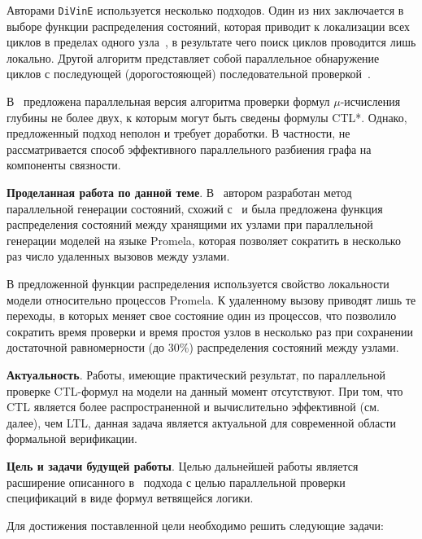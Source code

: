 \documentclass[a4paper,notitlepage,14pt]{article}
\begin{document}
Авторами \texttt{DiVinE} используется несколько подходов. Один из них заключается в выборе
функции распределения состояний, которая приводит к локализации всех циклов в пределах
одного узла~\cite{DLTL1}, в результате чего поиск циклов проводится лишь локально. Другой
алгоритм представляет собой параллельное обнаружение циклов с последующей (дорогостояющей)
последовательной проверкой~\cite{DLTL2}.

В~\cite{Leucker_parallelmodel} предложена параллельная версия алгоритма проверки формул
$\mu$-исчисления глубины не более двух, к которым могут быть сведены формулы CTL*. Однако,
предложенный подход неполон и требует доработки. В частности, не рассматривается способ
эффективного параллельного разбиения графа на компоненты связности.

\textbf{Проделанная работа по данной теме}. В~\cite{Korotkov10Miem} автором разработан
метод параллельной генерации состояний, схожий с~\cite{LS99,Stern97parallelizingthe} и
была предложена функция распределения состояний между хранящими их узлами при параллельной
генерации моделей на языке Promela, которая позволяет сократить в несколько раз число
удаленных вызовов между узлами.

В предложенной функции распределения используется свойство локальности модели относительно
процессов Promela. К удаленному вызову приводят лишь те переходы, в которых меняет свое
состояние один из процессов, что позволило сократить время проверки и время простоя узлов
в несколько раз при сохранении достаточной равномерности (до 30\%) распределения состояний
между узлами.


\textbf{Актуальность}. Работы, имеющие практический результат, по параллельной проверке
CTL-формул на модели на данный момент отсутствуют. При том, что CTL является более
распространенной и вычислительно эффективной (см. далее), чем LTL, данная задача является
актуальной для современной области формальной верификации.


\textbf{Цель и задачи будущей работы}. Целью дальнейшей работы является расширение
описанного в~\cite{Korotkov10Miem} подхода с целью параллельной проверки спецификаций в
виде формул ветвящейся логики.

Для достижения поставленной цели необходимо решить следующие задачи:
\end{document}
